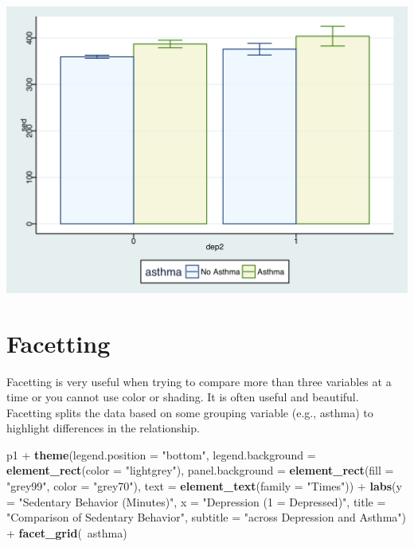 \documentclass[]{tufte-book}
\newenvironment{Shaded}{}{}
\newcommand{\KeywordTok}[1]{\textcolor[rgb]{0.00,0.44,0.13}{\textbf{#1}}}
\newcommand{\DataTypeTok}[1]{\textcolor[rgb]{0.56,0.13,0.00}{#1}}
\newcommand{\StringTok}[1]{\textcolor[rgb]{0.25,0.44,0.63}{#1}}
\newcommand{\OperatorTok}[1]{\textcolor[rgb]{0.40,0.40,0.40}{#1}}
\newcommand{\NormalTok}[1]{#1}
\theoremstyle{definition}
\theoremstyle{definition}
\theoremstyle{remark}
\begin{document}
\includegraphics{_main_files/figure-latex/unnamed-chunk-153-1}

\section*{Facetting}\label{facetting}

Facetting is very useful when trying to compare more than three
variables at a time or you cannot use color or shading. It is often
useful and beautiful. Facetting splits the data based on some grouping
variable (e.g., asthma) to highlight differences in the relationship.

\begin{Shaded}
\begin{Highlighting}[]
\NormalTok{p1 }\OperatorTok{+}\StringTok{ }\KeywordTok{theme}\NormalTok{(}\DataTypeTok{legend.position =} \StringTok{"bottom"}\NormalTok{, }\DataTypeTok{legend.background =} \KeywordTok{element_rect}\NormalTok{(}\DataTypeTok{color =} \StringTok{"lightgrey"}\NormalTok{), }
    \DataTypeTok{panel.background =} \KeywordTok{element_rect}\NormalTok{(}\DataTypeTok{fill =} \StringTok{"grey99"}\NormalTok{, }
        \DataTypeTok{color =} \StringTok{"grey70"}\NormalTok{), }\DataTypeTok{text =} \KeywordTok{element_text}\NormalTok{(}\DataTypeTok{family =} \StringTok{"Times"}\NormalTok{)) }\OperatorTok{+}\StringTok{ }
\StringTok{    }\KeywordTok{labs}\NormalTok{(}\DataTypeTok{y =} \StringTok{"Sedentary Behavior (Minutes)"}\NormalTok{, }\DataTypeTok{x =} \StringTok{"Depression (1 = Depressed)"}\NormalTok{, }
        \DataTypeTok{title =} \StringTok{"Comparison of Sedentary Behavior"}\NormalTok{, }
        \DataTypeTok{subtitle =} \StringTok{"across Depression and Asthma"}\NormalTok{) }\OperatorTok{+}\StringTok{ }
\StringTok{    }\KeywordTok{facet_grid}\NormalTok{(}\OperatorTok{~}\NormalTok{asthma)}
\end{Highlighting}
\end{Shaded}
\end{document}
